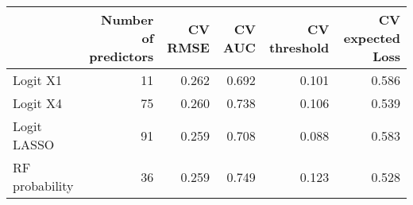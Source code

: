 
\begin{tabular}{lrrrrr}
\toprule
  & Number of predictors & CV RMSE & CV AUC & CV threshold & CV expected Loss\\
\midrule
Logit X1 & 11 & 0.262 & 0.692 & 0.101 & 0.586\\
Logit X4 & 75 & 0.260 & 0.738 & 0.106 & 0.539\\
Logit LASSO & 91 & 0.259 & 0.708 & 0.088 & 0.583\\
RF probability & 36 & 0.259 & 0.749 & 0.123 & 0.528\\
\bottomrule
\end{tabular}